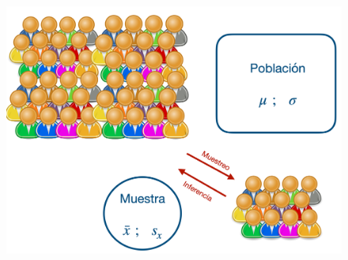 \vspace{1cm} %

	\begin{figure}[H]
	\centering
	\includegraphics[width=1\textwidth]{imagenes/imagenes05/T05IM01.png}
	\end{figure}

\vspace{1cm} %

